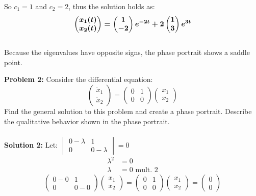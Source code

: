 \documentclass[12pt]{article}
\begin{document}
So $c_1 = 1$ and $c_2 = 2$, thus the solution holds as: 
$$
\boldmath
\begin{pmatrix}
x_1(t) \\
x_2(t)
\end{pmatrix} = 
\begin{pmatrix}
1 \\
-2
\end{pmatrix}
e^{-2t} + 
2
\begin{pmatrix}
1 \\
3
\end{pmatrix}
e^{3t}
$$ \\
Because the eigenvalues have opposite signs, the phase portrait shows a saddle point.

\newpage

\noindent \textbf{Problem 2: }Consider the differential equation:
$$
\begin{pmatrix}
	\dot{x}_1 \\
	\dot{x}_2
\end{pmatrix} = 
\begin{pmatrix}
	0 & 1 \\
	0 & 0
\end{pmatrix}
\begin{pmatrix}
	x_1 \\
	x_2
\end{pmatrix}
$$
Find the general solution to this problem and create a phase portrait. Describe the qualitative
behavior shown in the phase portrait.
\\ \\
\noindent \textbf{Solution 2: } Let:
$		
\begin{vmatrix}
0 - \lambda  & 1 \\
0 & 0 - \lambda
\end{vmatrix} = 0
$ 
\begin{align*}
	\lambda^2 &= 0 \\
	\lambda &= 0 \text{ mult. 2}
\end{align*}
$$
\begin{pmatrix}
	0 - 0 & 1 \\
	0 & 0 - 0	
\end{pmatrix}
\begin{pmatrix}
	x_1 \\
	x_2
\end{pmatrix} = 
\begin{pmatrix}
	0 & 1 \\
	0 & 0 	
\end{pmatrix}
\begin{pmatrix}
	x_1 \\
	x_2
\end{pmatrix} =
\begin{pmatrix}
	0 \\
	0
\end{pmatrix}
$$
\end{document}
